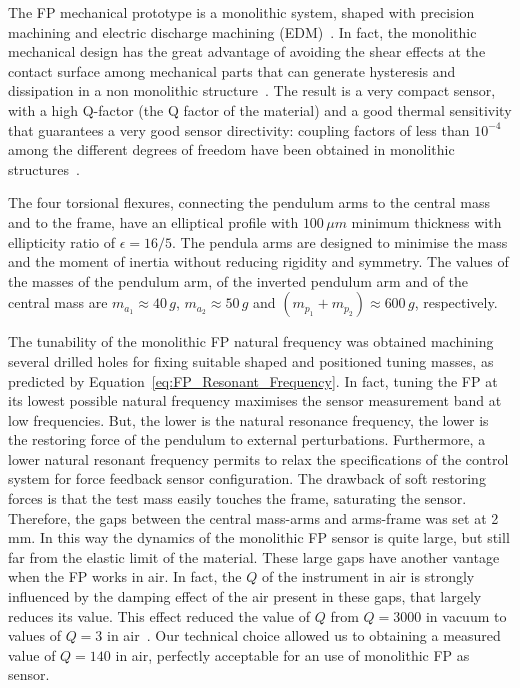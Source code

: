 \medskip


The FP mechanical prototype is a monolithic system, shaped with precision machining and electric discharge machining (EDM)~\cite{RSI-1, SMART10-1}. In fact, the monolithic mechanical design has the great advantage of avoiding the shear effects at the contact surface among mechanical parts that can generate hysteresis and dissipation in a non monolithic structure~\cite{BLAIR-1}. The result is a very compact sensor, with a high Q-factor (the Q factor of the material) and a good thermal sensitivity that guarantees a very good sensor directivity: coupling factors of less than $10^{-4}$ among the different degrees of freedom have been obtained in monolithic structures~\cite{FIDECARO-1}.

The four torsional flexures, connecting the pendulum arms to the central mass and to the frame, have an elliptical profile with $100\,\mu m$ minimum thickness with ellipticity ratio of $\epsilon = 16/5$. The pendula arms are designed to minimise the mass and the moment of inertia without reducing rigidity and symmetry. The values of the masses of the pendulum arm, of the inverted pendulum arm and of the central mass are $m_{a_1} \approx 40\,g$, $m_{a_2} \approx 50\,g$ and $(m_{p_1}+m_{p_2}) \approx 600\,g$, respectively. 

The tunability of the monolithic FP natural frequency was obtained machining several drilled holes for fixing suitable shaped and positioned tuning masses, as predicted by Equation~\ref{eq:FP_Resonant_Frequency}. In fact, tuning the FP at its lowest possible natural frequency maximises the sensor measurement band at low frequencies. But, the lower is the natural resonance frequency, the lower is the restoring force of the pendulum to external perturbations. Furthermore, a lower natural resonant frequency permits to relax the specifications of the control system for force feedback sensor configuration. The drawback of soft restoring forces is that the test mass easily touches the frame, saturating the sensor. Therefore, the gaps between the central mass-arms and arms-frame was set at  2\,mm. In this way the dynamics of the monolithic FP sensor is  quite large, but still far from the elastic limit of the material. These large gaps have another vantage when the FP works in air. In fact, the $Q$ of the instrument in air is strongly influenced by the damping effect of the air present in these gaps, that largely reduces its value. This effect reduced the value of $Q$ from $Q = 3000$ in vacuum to values of $Q=3$ in air~\cite{FIDECARO-1}. Our technical choice allowed us to obtaining a measured value of $Q = 140$ in air, perfectly acceptable for an use of monolithic FP as sensor.

